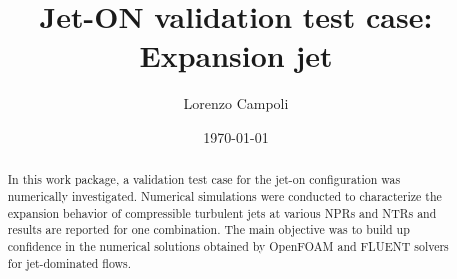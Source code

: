 \documentclass[12pt]{article}
\title{Jet-ON validation test case: Expansion jet}
\author{Lorenzo Campoli}
\date{\today}
\begin{document}
\setmainfont{Arial}

\maketitle

\renewcommand{\arraystretch}{1.5} %
\setlength{\tabcolsep}{8pt}       %

\begin{center}
\end{center}

\begin{abstract}
\noindent In this work package, a validation test case for the jet-on configuration was numerically investigated. Numerical simulations were conducted to characterize the expansion behavior of compressible turbulent jets at various NPRs and NTRs and results are reported for one combination. The main objective was to build up confidence in the numerical solutions obtained by OpenFOAM and FLUENT solvers for jet-dominated flows. 

\end{abstract}

%

\tableofcontents


\end{document}
